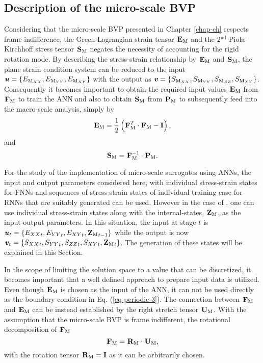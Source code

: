 \subsection{Description of the micro-scale BVP}\label{nn-bvp}
Considering that the micro-scale BVP presented in Chapter \ref{chap-ch} respects frame indifference, the Green-Lagrangian strain tensor $ \tgm[]{E} $ and the 2$ ^\text{nd} $ Piola-Kirchhoff stress tensor $ \tgm[]{S} $ negates the necessity of accounting for the rigid rotation mode. By describing the stress-strain relationship by $ \tgm[]{E} $ and $ \tgm[]{S} $, the plane strain condition system can be reduced to the input $ \textbf{\textit{u}}=\{E_{\text{M}_{XX}},E_{\text{M}_{YY}},E_{\text{M}_{XY}}\} $ with the output as $ \textbf{\textit{v}}=\{S_{\text{M}_{XX}},S_{\text{M}_{YY}},S_{\text{M}_{ZZ}},S_{\text{M}_{XY}}\} $. Consequently it becomes important to obtain the required input values $ \tgm[]{E} $ from $ \tgm[]{F} $ to train the ANN and also to obtain $ \tgm[]{S} $ from $ \tgm[]{P} $ to subsequently feed into the macro-scale analysis, simply by
\begin{equation}\label{eq-nn-io}
\tgm[]{E} = \frac{1}{2}\left(\tgm[]{F}^T\cdot\tgm[]{F}-\textbf{I}\right),
\end{equation}
and
\begin{equation}\label{eq-nn-io-1}
\tgm[]{S} = \tgm[]{F}^{-1}\cdot\tgm[]{P}.
\end{equation}

For the study of the implementation of micro-scale surrogates using ANNs, the input and output parameters considered here, with individual stress-strain states for FNNs and sequences of stress-strain states of individual training case for RNNs that are suitably generated can be used. However in the case of \fnn, one can use individual stress-strain states along with the internal-states, $ \tgm{Z} $, as the input-output parameters. In this situation, the input at stage $ t $ is $ \textbf{\textit{u}}_t=\{{{{E}}_{XX}}_t,{{{E}}_{YY}}_t,{{{E}}_{XY}}_t,{\tgm{Z}}_{t-1}\} $ while the output is now $ \textbf{\textit{v}}_t=\{{{{S}}_{XX}}_t,{{{S}}_{YY}}_t,{{{S}}_{ZZ}}_t,{{{S}}_{XY}}_t,{\tgm{Z}}_{t}\} $. The generation of these states will be explained in this Section.

In the scope of limiting the solution space to a value that can be discretized, it becomes important that a well defined approach to prepare input data is utilized. Even though $\tgm[]{E} $ is chosen as the input of the ANN, it can not be used directly as the boundary condition in Eq. (\ref{eq-periodic-3}). The connection between $ \tgm[]{F} $ and $ \tgm[]{E} $ can be instead established by the right stretch tensor $ \tgm[]{U} $.  With the assumption that the micro-scale BVP is frame indifferent, the rotational decomposition of $ \tgm[]{F} $
\begin{equation}\label{eq-nn-gen1}
\tgm[]{F}=\tgm[]{R}\cdot\tgm[]{U},
\end{equation}
with the rotation tensor $ \tgm[]{R}=\textbf{I} $ as it can be arbitrarily chosen. 

